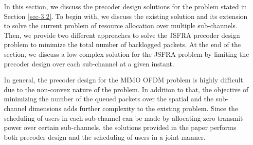 
In this section, we discuss the precoder design solutions for the problem stated in Section \ref{sec-3.2}. To begin with, we discuss the existing solution and its extension to solve the current problem of resource allocation over multiple sub-channels. Then, we provide two different approaches to solve the \ac{JSFRA} precoder design problem to minimize the total number of backlogged packets. At the end of the section, we discuss a low complex solution for the \ac{JSFRA} problem by limiting the precoder design over each sub-channel at a given instant.

In general, the precoder design for the \ac{MIMO} \ac{OFDM} problem is highly difficult due to the non-convex nature of the problem. In addition to that, the objective of minimizing the number of the queued packets over the spatial and the sub-channel dimensions adds further complexity to the existing problem. Since the scheduling of users in each sub-channel can be made by allocating zero transmit power over certain sub-channels, the solutions provided in the paper performs both precoder design and the scheduling of users in a joint manner. 